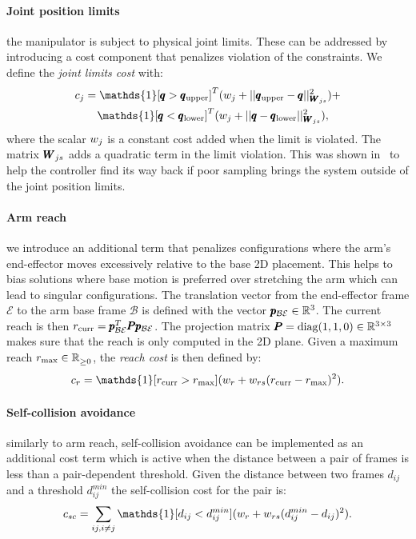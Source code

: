  \paragraph{Joint position limits} the manipulator is subject to physical joint limits. These can be addressed by introducing a cost component that penalizes violation of the constraints. We define the \textit{joint limits cost} with:
 \begin{align}
     &c_{j} = \mathds{1}[\configRobot > \upperLimits]^T(\weightScalar{j} + ||\upperLimits - \configRobot||^2_{\weightMatrix{js}}) + \nonumber\\ 
     &\qquad\mathds{1}[\configRobot < \lowerLimits]^T(\weightScalar{j} +  || \configRobot - \lowerLimits||^2_{\weightMatrix{js}}), 
 \end{align}
 where the scalar $w_{j}$ is a constant cost added when the limit is violated. The matrix $\pmb{W}_{js}$ adds a quadratic term in the limit violation. This was shown in~\cite{williams_information-theoretic_2018} to help the controller find its way back if poor sampling brings the system outside of the joint position limits.
 
 \paragraph{Arm reach} we introduce an additional term that penalizes configurations where the arm's end-effector moves excessively relative to the base 2D placement. This helps to bias solutions where base motion is preferred over stretching the arm which can lead to singular configurations. The translation vector from the end-effector frame $\mathcal{E}$ to the arm base frame $\mathcal{B}$ is defined with the vector $\pmb{p}_{\mathcal{B}\mathcal{E}} \in \mathbb{R}^{3}$. The current reach is then $r_{\text{curr}} =  \pmb{p}_{\mathcal{B}\mathcal{E}}^T \pmb{P} \pmb{p}_{\mathcal{B}\mathcal{E}}$. The projection matrix $\pmb{P} = \text{diag}(1, 1, 0) \in \mathbb{R}^{3 \times 3}$ makes sure that the reach is only computed in the 2D plane. Given a maximum reach $r_{\text{max}} \in \mathbb{R}^{}_{\geq 0}$, the \textit{reach cost} is then defined by:
 \begin{equation}
   c_r = \mathds{1}[r_{\text{curr}} > r_{\text{max}}] (\weightScalar{r} + \weightScalar{rs}(r_{\text{curr}} - r_{\text{max}})^2).    
 \end{equation}

 \paragraph{Self-collision avoidance} similarly to arm reach, self-collision avoidance can be implemented as an additional cost term which is active when the distance between a pair of frames is less than a pair-dependent threshold. Given the distance between two frames $d_{ij}$ and a threshold $d^{min}_{ij}$ the self-collision cost for the pair is:
 \begin{equation}
   c_{sc} = \sum_{ij, i \neq j} \mathds{1}[d_{ij} < d^{min}_{ij}] (\weightScalar{r} + \weightScalar{rs}(d^{min}_{ij} - d_{ij})^2).    
 \end{equation}
 
